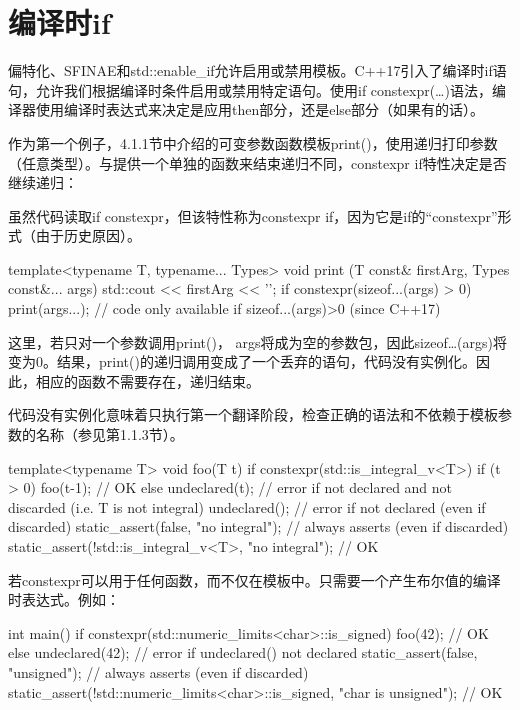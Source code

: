 \section{编译时if}
偏特化、SFINAE和std::enable\_if允许启用或禁用模板。C++17引入了编译时if语句，允许我们根据编译时条件启用或禁用特定语句。使用if constexpr(…)语法，编译器使用编译时表达式来决定是应用then部分，还是else部分（如果有的话）。

作为第一个例子，4.1.1节中介绍的可变参数函数模板print()，使用递归打印参数（任意类型）。与提供一个单独的函数来结束递归不同，constexpr if特性决定是否继续递归：

\begin{notice}
虽然代码读取if constexpr，但该特性称为constexpr if，因为它是if的“constexpr”形式（由于历史原因）。
\end{notice}

\begin{cpp}
template<typename T, typename... Types>
void print (T const& firstArg, Types const&... args)
{
	std::cout << firstArg << '\n';
	if constexpr(sizeof...(args) > 0) {
		print(args...); // code only available if sizeof...(args)>0 (since C++17)
	}
}
\end{cpp}

这里，若只对一个参数调用print()， args将成为空的参数包，因此sizeof…(args)将变为0。结果，print()的递归调用变成了一个丢弃的语句，代码没有实例化。因此，相应的函数不需要存在，递归结束。

代码没有实例化意味着只执行第一个翻译阶段，检查正确的语法和不依赖于模板参数的名称（参见第1.1.3节）。

\begin{cpp}
template<typename T>
void foo(T t)
{
	if constexpr(std::is_integral_v<T>) {
		if (t > 0) {
			foo(t-1); // OK
		}
	}
	else {
		undeclared(t); // error if not declared and not discarded (i.e. T is not integral)
		undeclared(); // error if not declared (even if discarded)
		static_assert(false, "no integral"); // always asserts (even if discarded)
		static_assert(!std::is_integral_v<T>, "no integral"); // OK
	}
}
\end{cpp}

若constexpr可以用于任何函数，而不仅在模板中。只需要一个产生布尔值的编译时表达式。例如：

\begin{cpp}
int main()
{
	if constexpr(std::numeric_limits<char>::is_signed) {
		foo(42); // OK
	}
	else {
		undeclared(42); // error if undeclared() not declared
		static_assert(false, "unsigned"); // always asserts (even if discarded)
		static_assert(!std::numeric_limits<char>::is_signed,
		"char is unsigned"); // OK
	}
}
\end{cpp}


